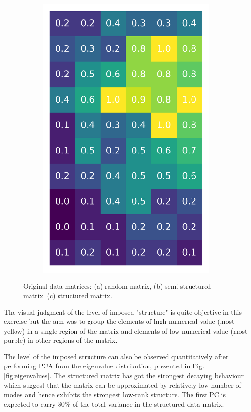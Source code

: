 \documentclass[10pt,twocolumn]{article}
\begin{document}
\begin{figure}[H]
\begin{subfigure}[t]{.15\textwidth}
\includegraphics[scale=.2]{DWGs/structured-matrix-original.png}
\caption{ }
\end{subfigure}
\caption{Original data matrices: (a) random matrix, (b) semi-structured matrix, (c) structured matrix.}
\label{fig:matrices}
\end{figure}

The visual judgment of the level of imposed "structure" is quite objective in this exercise but the aim was to group the elements of high numerical value (most yellow) in a single region of the matrix and elements of low numerical value (most purple) in other regions of the matrix.

The level of the imposed structure can also be observed quantitatively after performing PCA from the eigenvalue distribution, presented in Fig.\ref{fig:eigenvalues}. The structured matrix has got the strongest decaying behaviour which suggest that the matrix can be approximated by relatively low number of modes and hence exhibits the strongest low-rank structure. The first PC is expected to carry 80\% of the total variance in the structured data matrix.
\end{document}
